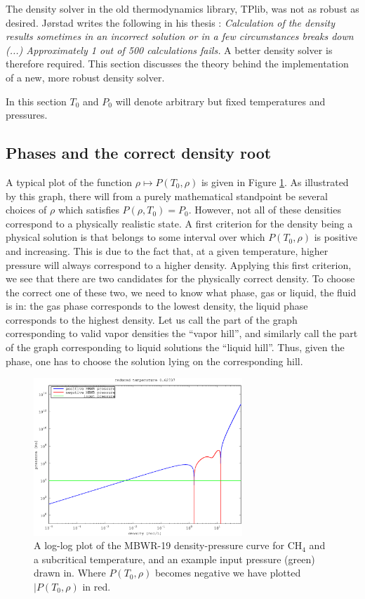 \documentclass[internal,english]{sintefmemo2012}
\numberwithin{equation}{section}
\begin{document}
The density solver in the old thermodynamics library, TPlib, was not as robust as
desired. Jørstad writes the following in his thesis \cite{Jorstad93}:
\textit{Calculation of the density results sometimes in an incorrect
  solution or in a few circumstances breaks down (...) Approximately 1
  out of 500 calculations fails.} A better density solver is therefore
required. This section discusses the theory behind the implementation
of a new, more robust density solver.

In this section $T_0$ and $P_0$ will denote arbitrary but fixed
temperatures and pressures.

\subsection{Phases and the correct density root} %
A typical plot of the function $\rho \mapsto P(T_0,\rho)$ is given in
Figure \ref{fig:p_ill}. As illustrated by this graph, there will
from a purely mathematical standpoint be several choices of $\rho$
which satisfies $P(\rho,T_0) = P_0$. However, not all of these
densities correspond to a physically realistic state. A first
criterion for the density being a physical solution is that belongs to
some interval over which $P(T_0,\rho)$ is positive and
increasing. This is due to the fact that, at a given temperature,
higher pressure will always correspond to a higher density. Applying
this first criterion, we see that there are two candidates for the
physically correct density. To choose the correct one of these two, we
need to know what phase, gas or liquid, the fluid is in: the gas phase
corresponds to the lowest density, the liquid phase corresponds to the
highest density. Let us call the part of the graph corresponding to
valid vapor densities the ``vapor hill'', and similarly call the part of the
graph corresponding to liquid solutions the ``liquid hill''. Thus,
given the phase, one has to choose the solution lying on the
corresponding hill.

\begin{figure}[h]
  \centering
  \includegraphics[width=0.7\textwidth]{figures/pressureIllustration.eps}
  \caption{A log-log plot of the MBWR-19 density-pressure curve for CH$_4$ and a
    subcritical temperature, and an example input pressure (green) drawn
    in. Where $P(T_0,\rho)$ becomes negative we have plotted
    $|P(T_0,\rho)$ in red.}
  \label{fig:p_ill}
\end{figure}
\end{document}

